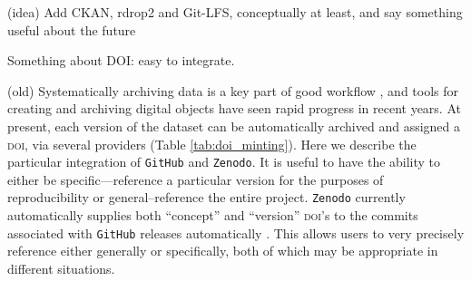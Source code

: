 \documentclass[a4paper,11pt]{article}
\begin{document}
(idea) Add CKAN, rdrop2 and Git-LFS, conceptually at least, and say something useful about the future

Something about DOI: easy to integrate.

(old) Systematically archiving data is a key part of good workflow \citep{Wilkinson-2016, Piwowar-2011, Whitlock-2011}, and tools for creating and archiving digital objects have seen rapid progress in recent years. At present, each version of the dataset can be automatically archived and assigned a \textsc{doi}, via several providers (Table \ref{tab:doi_minting}). Here we describe the particular integration of \texttt{GitHub} and \texttt{Zenodo}. It is useful to have the ability to either be specific---reference a particular version for the purposes of reproducibility or general--reference the entire project. \texttt{Zenodo} currently automatically supplies both ``concept'' and ``version'' \textsc{doi}'s to the commits associated with \texttt{GitHub} releases automatically \citep[Fig. \ref{fig:semantic} and ][]{Nielsen-2017}. This allows users to very precisely reference either generally or specifically, both of which may be appropriate in different situations.



\end{document}
